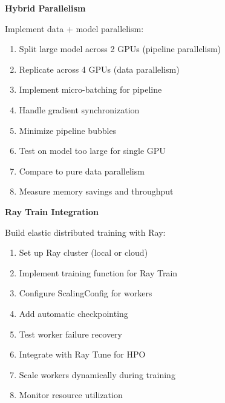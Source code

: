 \begin{exercise}
\textbf{Hybrid Parallelism}

Implement data + model parallelism:

\begin{enumerate}
    \item Split large model across 2 GPUs (pipeline parallelism)
    \item Replicate across 4 GPUs (data parallelism)
    \item Implement micro-batching for pipeline
    \item Handle gradient synchronization
    \item Minimize pipeline bubbles
    \item Test on model too large for single GPU
    \item Compare to pure data parallelism
    \item Measure memory savings and throughput
\end{enumerate}
\end{exercise}

\begin{exercise}
\textbf{Ray Train Integration}

Build elastic distributed training with Ray:

\begin{enumerate}
    \item Set up Ray cluster (local or cloud)
    \item Implement training function for Ray Train
    \item Configure ScalingConfig for workers
    \item Add automatic checkpointing
    \item Test worker failure recovery
    \item Integrate with Ray Tune for HPO
    \item Scale workers dynamically during training
    \item Monitor resource utilization
\end{enumerate}
\end{exercise}